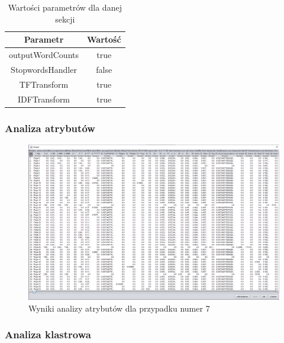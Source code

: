 \documentclass[../EDI_Task2_Karwowski_Kowalewski.tex]{subfiles}
\begin{document}
{{        \begin{table}[!htbp]
            \small
            \centering
            \begin{tabular}{|c|c|}
                \hline
                Parametr & Wartość \\ \hline
                outputWordCounts & true \\ \hline
                StopwordsHandler & false \\ \hline
                TFTransform & true \\ \hline
                IDFTransform & true \\ \hline
            \end{tabular}
            \caption{Wartości parametrów dla danej sekcji}
        \end{table}
        \FloatBarrier

        \subsubsection{Analiza atrybutów} {

            \begin{figure}[!htbp]
                \centering
                \includegraphics[width=\textwidth]{img/results2/weeia-case7.png}
                \caption{Wyniki analizy atrybutów dla przypadku numer 7}
            \end{figure}
            \FloatBarrier
        }

        \subsubsection{Analiza klastrowa} {

}}}
\end{document}
